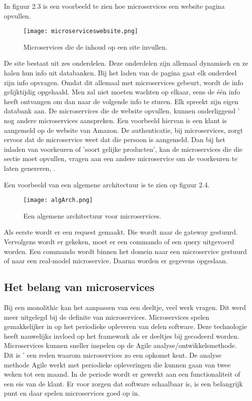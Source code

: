 In figuur 2.3 is een voorbeeld te zien hoe microservices een  website pagina opvullen.
\begin{figure}[h]
	\texttt{[image: microserviceswebsite.png]}
	\centering
	\caption{Microservices die de inhoud op een site invullen. \textcite{Koukia2018}}
\end{figure}
De site bestaat uit zes onderdelen. Deze onderdelen zijn allemaal dynamisch en ze halen hun info uit databanken. Bij het laden van de pagina gaat elk onderdeel zijn info opvragen. Omdat dit allemaal met microservices gebeurt, wordt de info gelijktijdig opgehaald. Men zal niet moeten wachten op elkaar, eens de één info heeft ontvangen om dan naar de volgende info te sturen. Elk spreekt zijn eigen databank aan. De microservices die de  website opvullen, kunnen onderliggend ' nog andere microservices aanspreken. Een voorbeeld hiervan is een klant is aangemeld op de  website van Amazon. De authenticatie, bij microservices, zorgt ervoor dat de microservice weet dat die persoon is aangemeld. Dan bij het inladen van voorkeuren of 'soort gelijke producten', kan de microservices die die sectie moet opvullen, vragen aan een andere microservice om de voorkeuren te laten genereren, \textcite{Koukia2018}.

Een voorbeeld van een algemene architectuur is te zien op figuur 2.4.
\begin{figure}[h]
	\texttt{[image: algArch.png]}
	\centering
	\caption{Een algemene architectuur voor microservices. \textcite{Koukia2018}}
\end{figure}
Als eerste wordt er een request gemaakt. Die wordt naar de gateway gestuurd. Vervolgens wordt er gekeken, moet er een commando of een query uitgevoerd worden. Een commando wordt binnen het domein naar een microservice gestuurd of naar een real-model microservice.  Daarna worden er gegevens opgeslaan.


\subsection{Het belang van microservices}
Bij een monolithic kan het aanpassen van een deeltje, veel  werk vragen. Dit  werd meer uitgelegd bij de definite van microservices. Microservices spelen gemakkelijker in op het periodieke opleveren van delen software. Deze technologie heeft nauwelijks invloed op het framework als er deeltjes bij gecodeerd worden. Microservices kunnen sneller inspelen op de Agile analyse/ontwikkelsmethode. Dit is ' een reden waarom microservices zo een opkomst kent. De analyse methode Agile  werkt met periodieke opleveringen die kunnen gaan van twee  weken tot een maand. In de periode wordt er gewerkt aan een functionaliteit of een eis van de klant. 
Er voor zorgen dat software schaalbaar is, is een belangrijk punt en daar spelen microservices goed op in.



